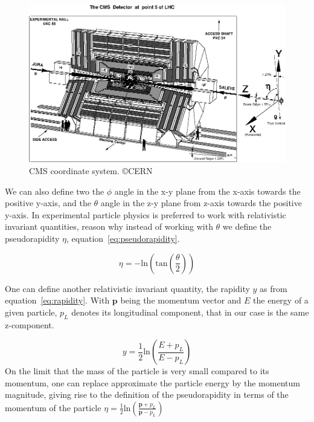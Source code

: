\begin{figure}[!Hhtbp]
  \begin{center}
    \includegraphics[width=\textwidth]{figs/CMS_coordinates.jpg}
    \caption{CMS coordinate system. \copyright CERN}
    \label{fig:cmscoor}
  \end{center}
\end{figure}

We can also define two the $\phi$ angle in the x-y plane from the x-axis towards the positive y-axis, and the $\theta$ angle in the z-y plane from z-axis towards the positive y-axis. In experimental particle physics is preferred to work with relativistic invariant quantities, reason why instead of working with $\theta$ we define the pseudorapidity $\eta$, equation~\ref{eq:pseudorapidity}. 

\begin{equation}
  \label{eq:pseudorapidity}
  \eta = -\text{ln}\left( \text{tan}\left(\frac{\theta}{2}\right)\right)
\end{equation} 

One can define another relativistic invariant quantity, the rapidity $y$ as from equation~\ref{eq:rapidity}. With $\bm{p}$ being the momentum vector and $E$ the energy of a given particle, $p_{L}$ denotes its longitudinal component, that in our case is the same z-component. 

\begin{equation}
  \label{eq:rapidity}
  y=\frac{1}{2}\text{ln}\left(\frac{E+p_{L}}{E-p_{L}}\right)
\end{equation}On the limit that the mass of the particle is very small compared to its momentum, one can replace approximate the particle energy by the momentum magnitude, giving rise to the definition of the pseudorapidity in terms of the momentum of the particle $\eta = \frac{1}{2}\text{ln}\left(\frac{\bm{p}+p_{L}}{\bm{p}-p_{L}}\right)$

